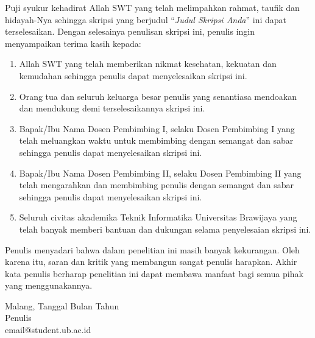 \documentclass{skripsi}
\begin{document}
{\preface

  Puji syukur kehadirat Allah SWT yang telah melimpahkan rahmat,
  taufik dan hidayah-Nya sehingga skripsi yang berjudul ``\textit{Judul
  Skripsi Anda}'' ini dapat terselesaikan. Dengan selesainya penulisan
  skripsi ini, penulis ingin menyampaikan terima kasih kepada:

  \begin{singlespace}
    \begin{enumerate}
    \item{Allah SWT yang telah memberikan nikmat kesehatan, kekuatan dan
        kemudahan sehingga penulis dapat menyelesaikan skripsi ini.}
    \item{Orang tua dan seluruh keluarga besar penulis yang senantiasa
        mendoakan dan mendukung demi terselesaikannya skripsi ini.}
    \item{Bapak/Ibu Nama Dosen Pembimbing I, selaku Dosen Pembimbing I
        yang telah meluangkan waktu untuk membimbing dengan semangat dan
        sabar sehingga penulis dapat menyelesaikan skripsi ini.}
    \item{Bapak/Ibu Nama Dosen Pembimbing II, selaku Dosen Pembimbing II
        yang telah mengarahkan dan membimbing penulis dengan semangat dan
        sabar sehingga penulis dapat menyelesaikan skripsi ini.}
    \item{Seluruh civitas akademika Teknik Informatika Universitas
        Brawijaya yang telah banyak memberi bantuan dan dukungan selama
        penyelesaian skripsi ini.}
    \end{enumerate}
  \end{singlespace}

  Penulis menyadari bahwa dalam penelitian ini masih banyak
  kekurangan. Oleh karena itu, saran dan kritik yang membangun sangat
  penulis harapkan. Akhir kata penulis berharap penelitian ini dapat
  membawa manfaat bagi semua pihak yang menggunakannya.

  \vspace{0.8cm}

  \noindent
  \hspace*{8cm}Malang, Tanggal Bulan Tahun  \vspace{1.5cm} \\

  \hspace*{6.8cm}Penulis \\
  \hspace*{8cm}email@student.ub.ac.id
}
\end{document}
